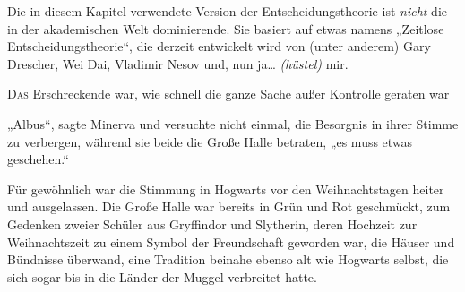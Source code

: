 
\begin{chapterOpeningAuthorNote}
% 
Die in diesem Kapitel verwendete Version der Entscheidungstheorie ist \emph{nicht} die in der akademischen Welt dominierende. Sie basiert auf etwas namens „Zeitlose Entscheidungstheorie“, die derzeit entwickelt wird von (unter anderem) Gary Drescher, Wei Dai, Vladimir Nesov und, nun ja… \emph{(hüstel)} mir.
\end{chapterOpeningAuthorNote}

\lettrine{D}{as} Erschreckende war, wie schnell die ganze Sache außer Kontrolle geraten war

„Albus“, sagte Minerva und versuchte nicht einmal, die Besorgnis in ihrer Stimme zu verbergen, während sie beide die Große Halle betraten, „es muss etwas geschehen.“

Für gewöhnlich war die Stimmung in Hogwarts vor den Weihnachtstagen heiter und ausgelassen. Die Große Halle war bereits in Grün und Rot geschmückt, zum Gedenken zweier Schüler aus Gryffindor und Slytherin, deren Hochzeit zur Weihnachtszeit zu einem Symbol der Freundschaft geworden war, die Häuser und Bündnisse überwand, eine Tradition beinahe ebenso alt wie Hogwarts selbst, die sich sogar bis in die Länder der Muggel verbreitet hatte.%

